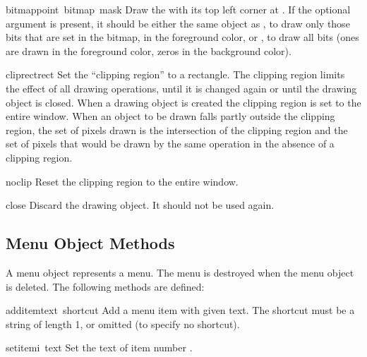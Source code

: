 \begin{funcdesc}{bitmap}{point\, bitmap\, mask}
Draw the  with its top left corner at .
If the optional  argument is present, it should be either
the same object as , to draw only those bits that are set
in the bitmap, in the foreground color, or , to draw all
bits (ones are drawn in the foreground color, zeros in the background
color).
\end{funcdesc}

\begin{funcdesc}{cliprect}{rect}
Set the ``clipping region'' to a rectangle.
The clipping region limits the effect of all drawing operations, until
it is changed again or until the drawing object is closed.  When a
drawing object is created the clipping region is set to the entire
window.  When an object to be drawn falls partly outside the clipping
region, the set of pixels drawn is the intersection of the clipping
region and the set of pixels that would be drawn by the same operation
in the absence of a clipping region.
\end{funcdesc}

\begin{funcdesc}{noclip}{}
Reset the clipping region to the entire window.
\end{funcdesc}

\begin{funcdesc}{close}{}
Discard the drawing object.  It should not be used again.
\end{funcdesc}

\subsection{Menu Object Methods}

A menu object represents a menu.
The menu is destroyed when the menu object is deleted.
The following methods are defined:

\renewcommand{\indexsubitem}{(menu method)}

\begin{funcdesc}{additem}{text\, shortcut}
Add a menu item with given text.
The shortcut must be a string of length 1, or omitted (to specify no
shortcut).
\end{funcdesc}

\begin{funcdesc}{setitem}{i\, text}
Set the text of item number
.
\end{funcdesc}

